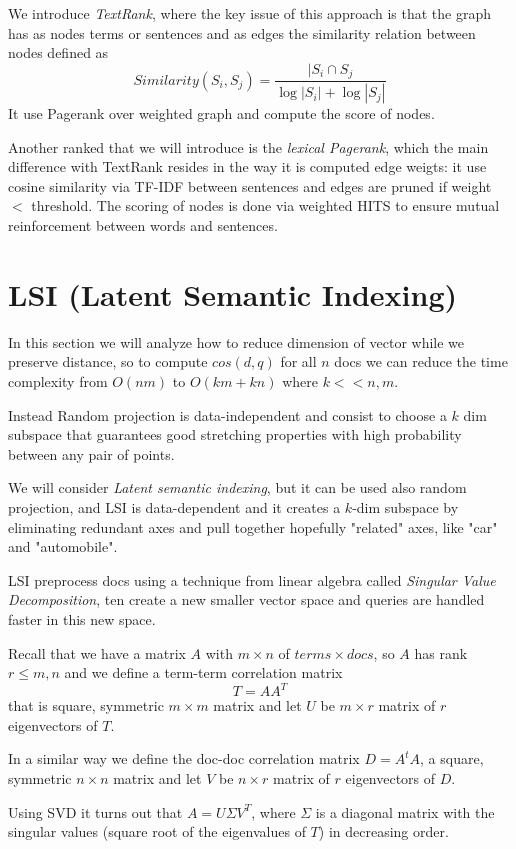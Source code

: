 We introduce \emph{TextRank}, where the key issue of this approach is that 
the graph has as nodes terms or sentences and as edges the similarity 
relation between nodes defined as 
\[ Similarity(S_i, S_j) = \frac{|S_i \cap S_j}{\log |S_i| + \log |S_j|} \]
It use Pagerank over weighted graph and compute the score of nodes.

Another ranked that we will introduce is the \emph{lexical Pagerank}, which
the main difference with TextRank resides in the way it is computed 
edge weigts: it use cosine similarity via TF-IDF between sentences and 
edges are pruned if weight $<$ threshold.\newline
The scoring of nodes is done via weighted HITS to ensure mutual reinforcement
between words and sentences.

\section{LSI (Latent Semantic Indexing)}
In this section we will analyze how to reduce dimension of vector while 
we preserve distance, so to compute $cos(d, q)$ for all $n$ docs we can 
reduce the time complexity from $O(nm)$ to $O(km + kn)$ where $k << n, m$.

Instead Random projection is data-independent and consist to choose a $k$
dim subspace that guarantees good stretching properties with high probability
between any pair of points.

We will consider \emph{Latent semantic indexing}, but it can be used also
random projection, and LSI is data-dependent and it creates a $k$-dim
subspace by eliminating redundant axes and pull together hopefully 
"related" axes, like "car" and "automobile".


LSI preprocess docs using a technique from linear algebra called 
\emph{Singular Value Decomposition}, ten create a new smaller vector space
and queries are handled faster in this new space.

Recall that we have a matrix $A$ with $m \times n$ of $terms \times docs$,
so $A$ has rank $r \leq m, n$ and we define a term-term correlation matrix
\[ T = AA^T \]
that is square, symmetric $m \times m$ matrix and let $U$ be $m \times r$
matrix of $r$ eigenvectors of $T$.

In a similar way we define the doc-doc correlation matrix $D = A^t A$,
a square, symmetric $n \times n$ matrix and let $V$ be $n \times r$ matrix
of $r$ eigenvectors of $D$.

Using SVD it turns out that $A = U \Sigma V^T$, where $\Sigma$ is a diagonal
matrix with the singular values (square root of the eigenvalues of $T$) in
decreasing order.

